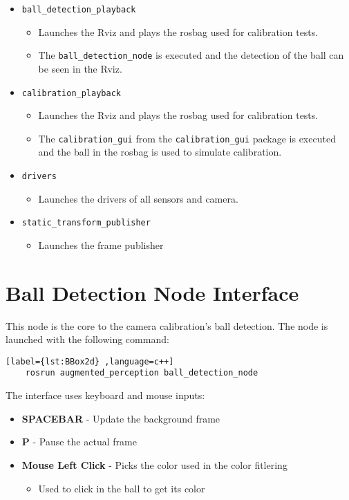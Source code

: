 \begin{itemize}
	\item \texttt{ball\_detection\_playback}
	\begin{itemize}
		\item Launches the Rviz and plays the rosbag used for calibration tests. 
		\item The \texttt{ball\_detection\_node} is executed and the detection of the ball can be seen in the Rviz.
	\end{itemize}
	\item \texttt{calibration\_playback}
	\begin{itemize}
		\item Launches the Rviz and plays the rosbag used for calibration tests. 
		\item The \texttt{calibration\_gui} from the \texttt{calibration\_gui} package is executed and the ball in the rosbag is used to simulate calibration.
	\end{itemize}
	\item \texttt{drivers}
	\begin{itemize}
		\item Launches the drivers of all sensors and camera.
	\end{itemize}
	\item \texttt{static\_transform\_publisher}
	\begin{itemize}
		\item Launches the frame publisher
	\end{itemize}	
\end{itemize}

\section{Ball Detection Node Interface}

This node is the core to the camera calibration's ball detection. The node is launched with the following command:

\begin{center}
	\begin{lstlisting}[label={lst:BBox2d} ,language=c++]
	rosrun augmented_perception ball_detection_node\end{lstlisting}
\end{center}

The interface uses keyboard and mouse inputs:

\begin{itemize}
	\item \textbf{SPACEBAR} - Update the background frame
	\item \textbf{P} - Pause the actual frame
	\item \textbf{Mouse Left Click} - Picks the color used in the color fitlering
	\begin{itemize}
		\item Used to click in the ball to get its color
	\end{itemize}
\end{itemize}

